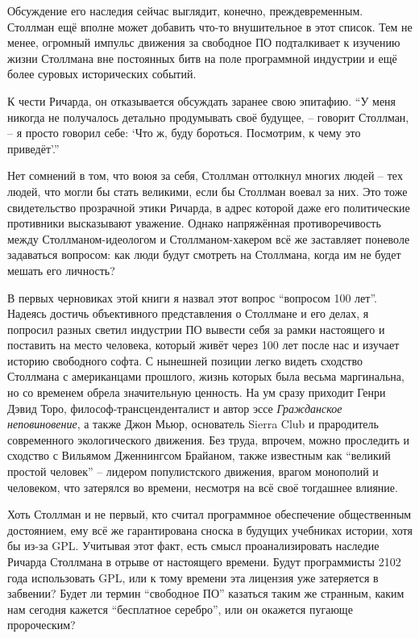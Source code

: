 Обсуждение его наследия сейчас выглядит, конечно, преждевременным. Столлман ещё вполне может добавить что-то внушительное в этот список. Тем не менее, огромный импульс движения за свободное ПО подталкивает к изучению жизни Столлмана вне постоянных битв на поле программной индустрии и ещё более суровых исторических событий.

К чести Ричарда, он отказывается обсуждать заранее свою эпитафию. \enquote{У меня никогда не получалось детально продумывать своё будущее, -- говорит Столлман, -- я просто говорил себе: \enquote{Что ж, буду бороться. Посмотрим, к чему это приведёт}.\hspace{0.01in}}

Нет сомнений в том, что воюя за себя, Столлман оттолкнул многих людей -- тех людей, что могли бы стать великими, если бы Столлман воевал за них. Это тоже свидетельство прозрачной этики Ричарда, в адрес которой даже его политические противники высказывают уважение. Однако напряжённая противоречивость между Столлманом-идеологом и Столлманом-хакером всё же заставляет поневоле задаваться вопросом: как люди будут смотреть на Столлмана, когда им не будет мешать его личность?

В первых черновиках этой книги я назвал этот вопрос \enquote{вопросом 100 лет}. Надеясь достичь объективного представления о Столлмане и его делах, я попросил разных светил индустрии ПО вывести себя за рамки настоящего и поставить на место человека, который живёт через 100 лет после нас и изучает историю свободного софта. С нынешней позиции легко видеть сходство Столлмана с американцами прошлого, жизнь которых была весьма маргинальна, но со временем обрела значительную ценность. На ум сразу приходит Генри Дэвид Торо, философ-трансценденталист и автор эссе \textit{Гражданское неповиновение}, а также Джон Мьюр, основатель Sierra Club и прародитель современного экологического движения. Без труда, впрочем, можно проследить и сходство с Вильямом Дженнингсом Брайаном, также известным как \enquote{великий простой человек} -- лидером популистского движения, врагом монополий и человеком, что затерялся во времени, несмотря на всё своё тогдашнее влияние.

Хоть Столлман и не первый, кто считал программное обеспечение общественным достоянием, ему всё же гарантирована сноска в будущих учебниках истории, хотя бы из-за GPL. Учитывая этот факт, есть смысл проанализировать наследие Ричарда Столлмана в отрыве от настоящего времени. Будут программисты 2102 года использовать GPL, или к тому времени эта лицензия уже затеряется в забвении? Будет ли термин \enquote{свободное ПО} казаться таким же странным, каким нам сегодня кажется \enquote{бесплатное серебро}, или он окажется пугающе пророческим?

